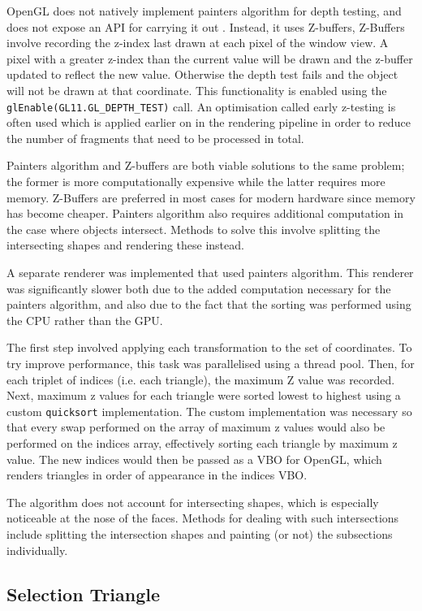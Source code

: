 \documentclass[12pt]{article}
\begin{document}
OpenGL does not natively implement painters algorithm for depth testing, and does not expose an API for carrying it out .
Instead, it uses Z-buffers, 
Z-Buffers involve recording the z-index last drawn at each pixel of the window view. 
A pixel with a greater z-index than the current value will be drawn and the z-buffer updated to reflect the new value.
Otherwise the depth test fails and the object will not be drawn at that coordinate.
This functionality is enabled using the \texttt{glEnable(GL11.GL\_DEPTH\_TEST)} call.
An optimisation called early z-testing is often used which is applied earlier on in the rendering pipeline in order to reduce the number of fragments that need to be processed in total.

Painters algorithm and Z-buffers are both viable solutions to the same problem; the former is more computationally expensive while the latter requires more memory.
Z-Buffers are preferred in most cases for modern hardware since memory has become cheaper. 
Painters algorithm also requires additional computation in the case where objects intersect. 
Methods to solve this involve splitting the intersecting shapes and rendering these instead.

A separate renderer was implemented that used painters algorithm.
This renderer was significantly slower both due to the added computation necessary for the painters algorithm, and also due to the fact that the sorting was performed using the CPU rather than the GPU.

The first step involved applying each transformation to the set of coordinates. 
To try improve performance, this task was parallelised using a thread pool.
Then, for each triplet of indices (i.e. each triangle), the maximum Z value was recorded.
Next, maximum z values for each triangle were sorted lowest to highest using a custom \texttt{quicksort} implementation.
The custom implementation was necessary so that every swap performed on the array of maximum z values would also be performed on the indices array, effectively sorting each triangle by maximum z value.
The new indices would then be passed as a VBO for OpenGL, which renders triangles in order of appearance in the indices VBO.

The algorithm does not account for intersecting shapes, which is especially noticeable at the nose of the faces.
Methods for dealing with such intersections include splitting the intersection shapes and painting (or not) the subsections individually.

\subsection{Selection Triangle}
\end{document}
